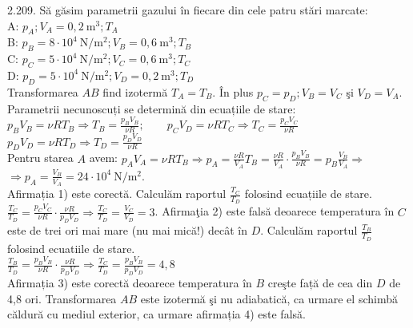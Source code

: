 2.209. Să găsim parametrii gazului în fiecare din cele patru stări marcate:\\ A: $p_{A} ; V_{A}=0,2 \mathrm{~m}^{3} ; T_{A}$\\ B: $p_{B}=8 \cdot 10^{4} \mathrm{~N} / \mathrm{m}^{2} ; V_{B}=0,6 \mathrm{~m}^{3} ; T_{B}$\\ C: $p_{C}=5 \cdot 10^{4} \mathrm{~N} / \mathrm{m}^{2} ; V_{C}=0,6 \mathrm{~m}^{3} ; T_{C}$\\ D: $p_{D}=5 \cdot 10^{4} \mathrm{~N} / \mathrm{m}^{2} ; V_{D}=0,2 \mathrm{~m}^{3} ; T_{D}$\\ Transformarea $A B$ find izotermă $T_{A}=T_{B}$. În plus $p_{C}=p_{D} ; V_{B}=V_{C}$ şi $V_{D}=V_{A}$. Parametrii necunoscuți se determină din ecuațiile de stare:\\ $p_{B} V_{B}=\nu R T_{B} \Rightarrow T_{B}=\frac{p_{B} V_{B}}{\nu R} ; \quad \quad p_{C} V_{D}=\nu R T_{C} \Rightarrow T_{C}=\frac{p_{C} V_{C}}{\nu R}$\\ $p_{D} V_{D}=\nu R T_{D} \Rightarrow T_{D}=\frac{p_{D} V_{D}}{\nu R}$\\ Pentru starea $A$ avem: $p_{A} V_{A}=\nu R T_{B} \Rightarrow p_{A}=\frac{\nu R}{V_{A}} T_{B}=\frac{\nu R}{V_{A}} \cdot \frac{p_{B} V_{B}}{\nu R}=p_{B} \frac{V_{B}}{V_{A}} \Rightarrow$ $\Rightarrow p_{A}=\frac{V_{B}}{V_{A}}=24 \cdot 10^{4} \mathrm{~N} / \mathrm{m}^{2}$.\\ Afirmația 1) este corectă. Calculăm raportul $\frac{T_{C}}{T_{D}}$ folosind ecuațiile de stare.\\ $\frac{T_{C}}{T_{D}}=\frac{p_{C} V_{C}}{\nu R} \cdot \frac{\nu R}{p_{D} V_{D}} \Rightarrow \frac{T_{C}}{T_{D}}=\frac{V_{C}}{V_{D}}=3$. Afirmaţia 2) este falsă deoarece temperatura în $C$ este de trei ori mai mare (nu mai mică!) decât în $D$. Calculăm raportul $\frac{T_{B}}{T_{D}}$ folosind ecuatiile de stare.\\ $\frac{T_{B}}{T_{D}}=\frac{p_{B} V_{B}}{\nu R} \cdot \frac{\nu R}{p_{D} V_{D}} \Rightarrow \frac{T_{C}}{T_{D}}=\frac{p_{B} V_{B}}{p_{D} V_{D}}=4,8$\\ Afirmația 3) este corectă deoarece temperatura în $B$ creşte față de cea din $D$ de 4,8 ori. Transformarea $A B$ este izotermă şi nu adiabatică, ca urmare el schimbă căldură cu mediul exterior, ca urmare afirmația 4) este falsă.\\


